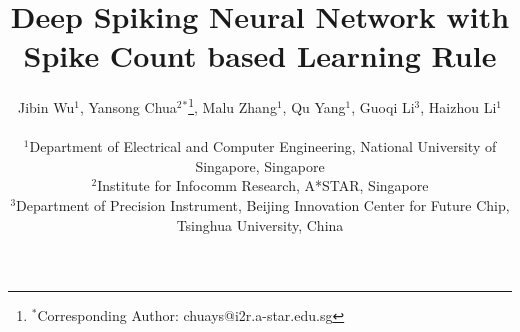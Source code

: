 \documentclass[conference]{IEEEtran}
\begin{document}
%
\title{Deep Spiking Neural Network with \\ Spike Count based Learning Rule}
\IEEEoverridecommandlockouts 
\author{
	Jibin Wu$^1$, Yansong Chua$^2{^{*}}$\thanks{$^{*}$Corresponding Author: chuays@i2r.a-star.edu.sg}, Malu Zhang$^1$, Qu Yang$^1$, Guoqi Li$^3$, Haizhou Li$^1$ 
	\\
	\\$^1$Department of Electrical and Computer Engineering, National University of Singapore, Singapore
	\\$^2$Institute for Infocomm Research, A*STAR, Singapore
	\\$^3$Department of Precision Instrument, Beijing Innovation Center for Future Chip, Tsinghua University, China
}

\maketitle
\end{document}
